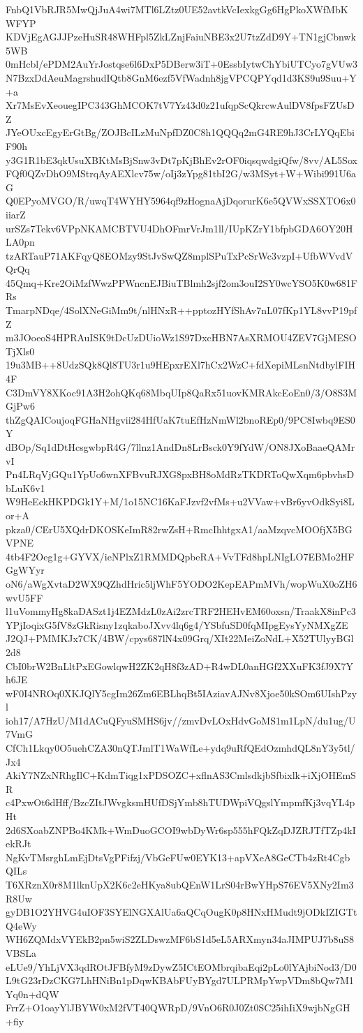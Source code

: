 FnbQ1VbRJR5MwQjJuA4wi7MTl6LZtz0UE52avtkVcIexkgGg6HgPkoXWfMbKWFYP
KDVjEgAGJJPzeHuSR48WHFpl5ZkLZnjFaiuNBE3x2U7tzZdD9Y+TN1gjCbnwk5WB
0mHcbl/ePDM2AuYrJostqse6l6DxP5DBerw3iT+0EssbIytwChYbiUTCyo7gVUw3
N7BzxDdAeuMagrshudIQtb8GnM6ezf5VfWadnh8jgVPCQPYqd1d3KS9u9Suu+Y+a
Xr7MsEvXeouegIPC343GhMCOK7tV7Yz43d0z21ufqpScQkrcwAulDV8fpsFZUsDZ
JYeOUxcEgyErGtBg/ZOJBcILzMuNpfDZ0C8h1QQQq2mG4RE9hJ3CrLYQqEbiF90h
y3G1R1bE3qkUsuXBKtMsBjSnw3vDt7pKjBhEv2rOF0iqsqwdgiQfw/8vv/AL5Sox
FQf0QZvDhO9MStrqAyAEXlcv75w/oIj3zYpg81tbI2G/w3MSyt+W+Wibi991U6aG
Q0EPyoMVGO/R/uwqT4WYHY5964qf9zHognaAjDqorurK6e5QVWxSSXTO6x0iiarZ
urSZs7Tekv6VPpNKAMCBTVU4DhOFmrVrJm1ll/IUpKZrY1bfpbGDA6OY20HLA0pn
tzARTauP71AKFqyQ8EOMzy9StJvSwQZ8mplSPuTxPcSrWc3vzpI+UfbWVvdVQrQq
45Qmq+Kre2OiMzfWwzPPWncnEJBiuTBlmh2sjf2om3ouI2SY0wcYSO5K0w681FRs
TmarpNDqe/4SolXNeGiMm9t/nlHNxR++pptozHYfShAv7nL07fKp1YL8vvP19pfZ
m3JOoeoS4HPRAuISK9tDcUzDUioWz1S97DxcHBN7AsXRMOU4ZEV7GjMESOTjXls0
19u3MB++8UdzSQk8Ql8TU3r1u9HEpxrEXl7hCx2WzC+fdXepiMLsnNtdbylFIH4F
C3DmVY8XKoc91A3H2ohQKq68MbqUIp8QaRx51uovKMRAkcEoEn0/3/O8S3MGjPw6
thZgQAICoujoqFGHaNHgvii284HfUaK7tuEfHzNmWl2bnoREp0/9PC8Iwbq9ES0Y
dBOp/Sq1dDtHcsgwbpR4G/7llnz1AndDn8LrBsck0Y9fYdW/ON8JXoBaaeQAMrvI
Pn4LRqVjGQu1YpUo6wnXFBvuRJXG8pxBH8oMdRzTKDRToQwXqm6pbvhsDbLuK6v1
W9HeEckHKPDGk1Y+M/1o15NC16KaFJzvf2vfMs+u2VVaw+vBr6yvOdkSyi8Lor+A
pkza0/CErU5XQdrDKOSKeImR82rwZsH+RmcIhhtgxA1/aaMzqvcMOOfjX5BGVPNE
4tb4F2Oeg1g+GYVX/ieNPlxZ1RMMDQpbeRA+VvTFd8hpLNIgLO7EBMo2HFGgWYyr
oN6/aWgXvtaD2WX9QZhdHric5ljWhF5YODO2KepEAPmMVh/wopWuX0oZH6wvU5FF
l1uVommyHg8kaDASzt1j4EZMdzL0zAi2zrcTRF2HEHvEM60oxsn/TraakX8inPc3
YPjIoqixG5fV8zGkRisny1zqkaboJXvv4lq6g4/YSbfuSD0fqMIpgEysYyNMXgZE
J2QJ+PMMKJx7CK/4BW/cpys687lN4x09Grq/XIt22MeiZoNdL+X52TUlyyBGl2d8
CbI0brW2BnLltPxEGowlqwH2ZK2qH8f3zAD+R4wDL0anHGf2XXuFK3fJ9X7Yh6JE
wF0I4NROq0XKJQlY5cgIm26Zm6EBLhqBt5IAziavAJNv8Xjoe50kSOm6UIshPzyl
ioh17/A7HzU/M1dACuQFyuSMHS6jv//zmvDvLOxHdvGoMS1m1LpN/du1ug/U7VmG
CfCh1Lkqy0O5uehCZA30nQTJmlT1WaWfLe+ydq9uRfQEdOzmhdQL8nY3y5tl/Jx4
AkiY7NZxNRhgIlC+KdmTiqg1xPDSOZC+xflnAS3CmlsdkjbSfbixlk+iXjOHEmSR
c4PxwOt6dHff/BzcZItJWvgksmHUfDSjYmb8hTUDWpiVQgslYmpmfKj3vqYL4pHt
2d6SXoabZNPBo4KMk+WmDuoGCOI9wbDyWr6sp555hFQkZqDJZRJTfTZp4kIekRJt
NgKvTMsrghLmEjDtsVgPFifzj/VbGeFUw0EYK13+apVXeA8GeCTb4zRt4CgbQILs
T6XRznX0r8M1lknUpX2K6c2eHKya8ubQEnW1LrS04rBwYHpS76EV5XNy2Im3R8Uw
gyDB1O2YHVG4uIOF3SYElNGXAlUa6aQCqOugK0p8HNxHMudt9jODkIZIGTtQ4eWy
WH6ZQMdxVYEkB2pn5wiS2ZLDswzMF6bS1d5eL5ARXmyn34aJIMPUJ7b8uS8VBSLa
eLUe9/YhLjVX3qdROtJFBfyM9zDywZ5ICtEOMbrqibaEqi2pLo0lYAjbiNod3/D0
L9tG23rDzCKG7LhHNiBn1pDqwKBAbFUyBYgd7ULPRMpYwpVDm8bQw7M1Yq0n+dQW
FrrZ+O1oayYlJBYW0xM2fVT40QWRpD/9VnO6R0J0Zt0SC25ihIiX9wjbNgGH+fiy
